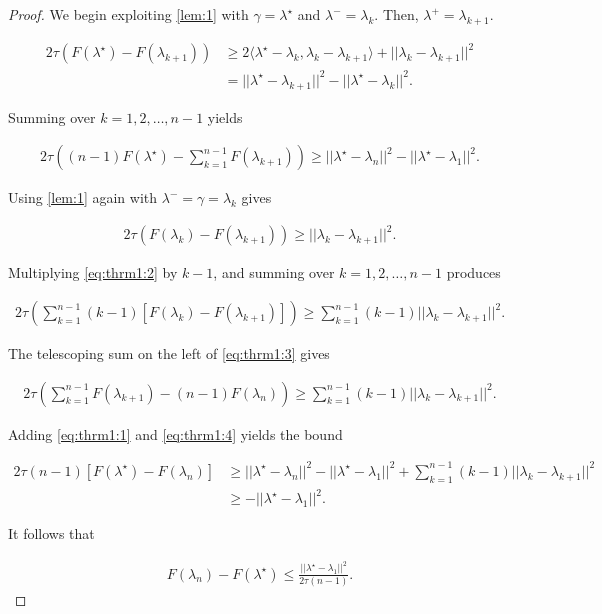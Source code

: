 \documentclass[11pt]{article}
\newcommand{\minus}{^-}
\newcommand{\inner}[2]{\langle #1, #2\rangle}
\begin{document}
\begin{proof}
We begin exploiting \cref{lem:1} with $\gamma = \lambda^\star$ and $\lambda\minus = \lambda_k$.  Then, $\lambda^+ = \lambda_{k+1}$.

\begin{align*}
2\tau(F(\lambda^\star) - F(\lambda_{k+1})) &\ge 2\inner{\lambda^\star - \lambda_k}{\lambda_k - \lambda_{k+1}} +  ||\lambda_k - \lambda_{k+1}||^2\\
&= ||\lambda^\star - \lambda_{k+1}||^2 - ||\lambda^\star - \lambda_k||^2.
\end{align*}

Summing over $k = 1, 2, \ldots, n-1$ yields

\begin{align}
2\tau\left((n-1)F(\lambda^\star) - \sum_{k=1}^{n-1} F(\lambda_{k+1}) \right) \ge ||\lambda^\star - \lambda_n||^2 - ||\lambda^\star - \lambda_1||^2. \label{eq:thrm1:1}
\end{align}

Using \cref{lem:1} again with $\lambda\minus = \gamma = \lambda_k$ gives

\begin{align}
2\tau \left(F(\lambda_k) - F(\lambda_{k+1})\right) \ge ||\lambda_k - \lambda_{k+1}||^2.\label{eq:thrm1:2}
\end{align}

Multiplying \cref{eq:thrm1:2} by $k-1$, and summing over $k = 1, 2, \ldots, n-1$ produces

\begin{align}
2\tau \left(\sum_{k=1}^{n-1} (k-1)\left[F(\lambda_k) - F(\lambda_{k+1})\right]\right) \ge \sum_{k=1}^{n-1} (k-1)||\lambda_k - \lambda_{k+1}||^2.\label{eq:thrm1:3}
\end{align}

The telescoping sum on the left of \cref{eq:thrm1:3} gives

\begin{align}
2\tau \left(\sum_{k=1}^{n-1} F(\lambda_{k+1}) - (n-1)F(\lambda_n)\right) \ge \sum_{k=1}^{n-1} (k-1)||\lambda_k - \lambda_{k+1}||^2.\label{eq:thrm1:4}
\end{align}

Adding \cref{eq:thrm1:1} and \cref{eq:thrm1:4} yields the bound

\begin{align}
2\tau(n-1)\left[F(\lambda^\star) - F(\lambda_n)\right] &\ge ||\lambda^\star - \lambda_n||^2 - ||\lambda^\star - \lambda_1||^2 +  \sum_{k=1}^{n-1} (k-1)||\lambda_k - \lambda_{k+1}||^2 \\
&\ge - ||\lambda^\star - \lambda_1||^2.
\end{align}

It follows that

\begin{align*}
F(\lambda_n) - F(\lambda^\star) \le \frac{||\lambda^\star - \lambda_1||^2}{2\tau(n-1)}.
\end{align*}
\end{proof}
\end{document}
